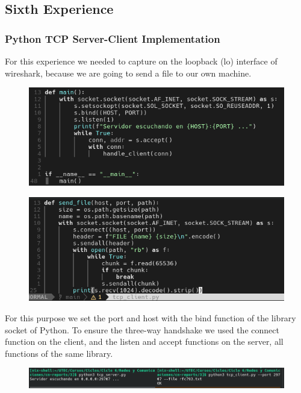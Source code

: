 \subsection{Sixth Experience}

\subsubsection{Python TCP Server-Client Implementation}
For this experience we needed to capture on the loopback (lo) interface of wireshark, because we are going to send a file to our own machine.

\begin{figure}[htbp]
	\centering
	\includegraphics[width=1\linewidth]{img/sixth_experience/1.png}
	\caption{}\label{fig:4_1}
\end{figure}

\begin{figure}[htbp]
	\centering
	\includegraphics[width=1\linewidth]{img/sixth_experience/2.png}
	\caption{}\label{fig:4_1}
\end{figure}

For this purpose we set the port and host with the bind function of the library socket of Python. To ensure the three-way handshake we used the connect function on the client, and the listen and accept functions on the server, all functions of the same library.

\begin{figure}[htbp]
	\centering
	\includegraphics[width=1\linewidth]{img/sixth_experience/3.png}
	\caption{}\label{fig:4_1}
\end{figure}

